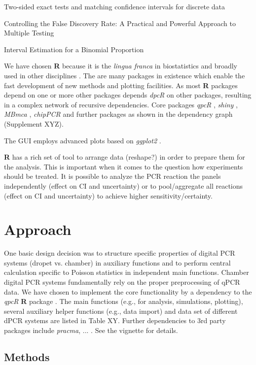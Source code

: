 \documentclass{bioinfo}
\begin{document}
Two-sided exact tests and matching confidence intervals for discrete data \cite{fay_2010}

Controlling the False Discovery Rate: A Practical and Powerful Approach to Multiple Testing \cite{benjamini_1995}

Interval Estimation for a Binomial Proportion \cite{brown_2001}



We have chosen \textbf{R} because it is the \textit{lingua franca} in 
biostatistics and broadly used in other disciplines \cite{rodiger_r_2015}. The 
are many packages in existence which enable the fast development of new methods 
and plotting facilities. As most \textbf{R} packages depend on one or more other 
packages \cite{ooms_2013} depends \textit{dpcR} on other packages, resulting in 
a complex network of recursive dependencies. Core packages \textit{qpcR} 
\cite{ritz_qpcr_2008}, \textit{shiny} \cite{shiny}, \textit{MBmca} 
\cite{rodiger_surface_2013}, \textit{chipPCR} \cite{rodiger_chippcr_2015} and 
further packages as shown in the dependency graph (Supplement XYZ).

The GUI employs advanced plots based on \textit{ggplot2} \cite{kahle_wickham_2013}. 

\textbf{R} has a rich set of tool to arrange data (reshape?) in order to prepare them for 
the analysis. This is important when it comes to the question how experiments 
should be treated. It is possible to analyze the PCR reaction the panels 
independently (effect on CI and uncertainty) or to pool/aggregate all reactions 
(effect on CI and uncertainty) to achieve higher sensitivity/certainty.

\section{Approach}
One basic design decision was to structure specific properties of digital PCR 
systems (dropet vs. chamber) in auxiliary functions and to perform central 
calculation specific to Poisson statistics in independent main functions. 
Chamber digital PCR systems fundamentally rely on the proper preprocessing of 
qPCR data. We have chosen to implement the core functionality by a dependency to 
the \textit{qpcR} \textbf{R} package \cite{ritz_qpcr_2008}. The main functions (e.g., for analysis, 
simulations, plotting), several auxiliary helper functions (e.g., data import) 
and data set of different dPCR systems are listed in Table XY. Further 
dependencies to 3rd party packages include \textit{pracma}, ... . See the vignette for 
details.
\begin{methods}
\section{Methods}



\end{methods}
\end{document}
